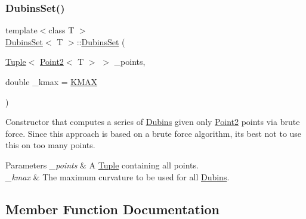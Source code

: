 \subsubsection{\texorpdfstring{DubinsSet()}{DubinsSet()}\hspace{0.1cm}{\footnotesize\ttfamily [4/4]}}
{\footnotesize\ttfamily template$<$class T $>$ \\
\mbox{\hyperlink{class_dubins_set}{Dubins\+Set}}$<$ T $>$\+::\mbox{\hyperlink{class_dubins_set}{Dubins\+Set}} (\begin{DoxyParamCaption}\item[{\mbox{\hyperlink{class_tuple}{Tuple}}$<$ \mbox{\hyperlink{class_point2}{Point2}}$<$ T $>$ $>$}]{\+\_\+points,  }\item[{double}]{\+\_\+kmax = {\ttfamily \mbox{\hyperlink{dubins_8hh_a940b85a83458e94519f2685b33ddd276}{K\+M\+AX}}} }\end{DoxyParamCaption})\hspace{0.3cm}{\ttfamily [inline]}}



Constructor that computes a series of {\ttfamily \mbox{\hyperlink{class_dubins}{Dubins}}} given only {\ttfamily \mbox{\hyperlink{class_point2}{Point2}}} points via brute force. Since this approach is based on a brute force algorithm, it\textquotesingle{}s best not to use this on too many points. 


\begin{DoxyParams}{Parameters}
{\em \+\_\+points} & A {\ttfamily \mbox{\hyperlink{class_tuple}{Tuple}}} containing all points. \\
\hline
{\em \+\_\+kmax} & The maximum curvature to be used for all {\ttfamily \mbox{\hyperlink{class_dubins}{Dubins}}}. \\
\hline
\end{DoxyParams}


\subsection{Member Function Documentation}
\mbox{\label{class_dubins_set_a12ea86c3250f8fff7a5db2d759cde33d}} 
